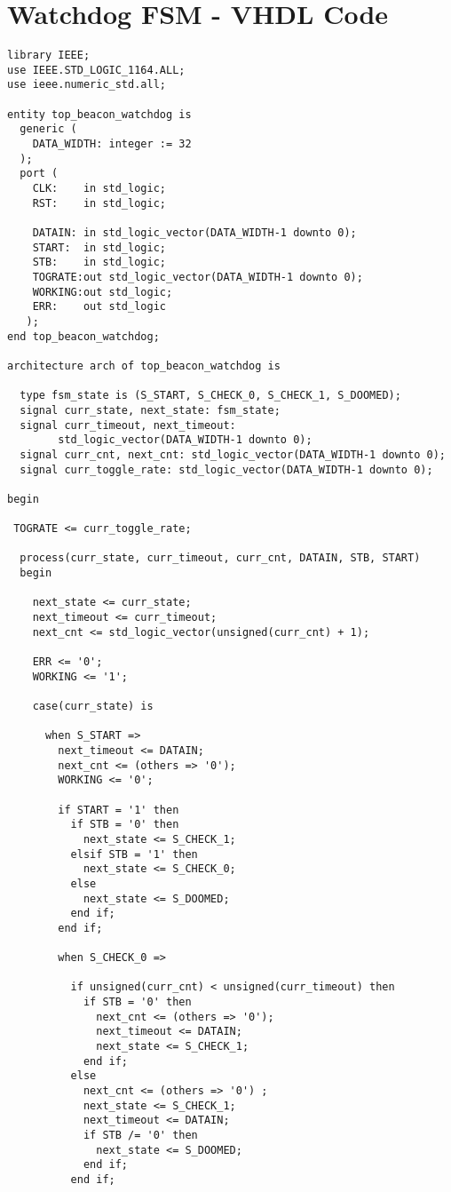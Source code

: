 \chapter{Watchdog FSM - VHDL Code}
\label{sec:watchdog_fsm}
\begin{lstlisting}[style=vhdl]
library IEEE;
use IEEE.STD_LOGIC_1164.ALL;
use ieee.numeric_std.all;

entity top_beacon_watchdog is
  generic (
    DATA_WIDTH: integer := 32
  );
  port (
    CLK:    in std_logic;
    RST:    in std_logic;

    DATAIN: in std_logic_vector(DATA_WIDTH-1 downto 0);
    START:  in std_logic;
    STB:    in std_logic;
    TOGRATE:out std_logic_vector(DATA_WIDTH-1 downto 0);
    WORKING:out std_logic;
    ERR:    out std_logic
   );
end top_beacon_watchdog;

architecture arch of top_beacon_watchdog is
    
  type fsm_state is (S_START, S_CHECK_0, S_CHECK_1, S_DOOMED);
  signal curr_state, next_state: fsm_state;
  signal curr_timeout, next_timeout: 
        std_logic_vector(DATA_WIDTH-1 downto 0);
  signal curr_cnt, next_cnt: std_logic_vector(DATA_WIDTH-1 downto 0);
  signal curr_toggle_rate: std_logic_vector(DATA_WIDTH-1 downto 0);

begin

 TOGRATE <= curr_toggle_rate;

  process(curr_state, curr_timeout, curr_cnt, DATAIN, STB, START)
  begin
  
    next_state <= curr_state;
    next_timeout <= curr_timeout;
    next_cnt <= std_logic_vector(unsigned(curr_cnt) + 1);
  
    ERR <= '0';
    WORKING <= '1';
  
    case(curr_state) is
  
      when S_START =>
        next_timeout <= DATAIN;
        next_cnt <= (others => '0');
        WORKING <= '0';
  
        if START = '1' then
          if STB = '0' then
            next_state <= S_CHECK_1;
          elsif STB = '1' then
            next_state <= S_CHECK_0;
          else
            next_state <= S_DOOMED;
          end if;
        end if;
  
        when S_CHECK_0 =>
  
          if unsigned(curr_cnt) < unsigned(curr_timeout) then
            if STB = '0' then
              next_cnt <= (others => '0');
              next_timeout <= DATAIN;
              next_state <= S_CHECK_1;
            end if;
          else
            next_cnt <= (others => '0') ;
            next_state <= S_CHECK_1;
            next_timeout <= DATAIN;
            if STB /= '0' then
              next_state <= S_DOOMED;
            end if;
          end if;
          

\end{lstlisting}
